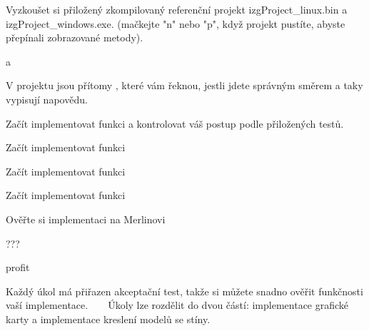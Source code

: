 \begin{DoxyEnumerate}
\item Vyzkoušet si přiložený zkompilovaný referenční projekt izg\+Project\+\_\+linux.\+bin a izg\+Project\+\_\+windows.\+exe. (mačkejte "{}n"{} nebo "{}p"{}, když projekt pustíte, abyste přepínali zobrazované metody). 
\item {} 
\item {} a  
\item V projektu jsou přítomy , které vám řeknou, jestli jdete správným směrem a taky vypisují napovědu. 
\item Začít implementovat funkci  a kontrolovat váš postup podle přiložených testů. 
\item Začít implementovat funkci  
\item Začít implementovat funkci  
\item Začít implementovat funkci  
\item Ověřte si implementaci na Merlinovi 
\item {} 
\item ??? 
\item profit 
\end{DoxyEnumerate}

Každý úkol má přiřazen akceptační test, takže si můžete snadno ověřit funkčnosti vaší implementace. ~\newline
~\newline
 Úkoly lze rozdělit do dvou částí\+: implementace grafické karty a implementace kreslení modelů se stíny. 